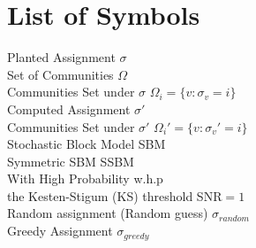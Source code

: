 \section*{List of Symbols}

\begin{large}
Planted Assignment \hfill $\sigma$\\
Set of Communities \hfill $\Omega$\\
Communities Set under $\sigma$ \hfill $\Omega_i=\{v: \sigma_v=i\}$\\
Computed Assignment \hfill $\sigma'$\\
Communities Set under $\sigma'$ \hfill $\Omega_i'=\{v: \sigma_v'=i\}$\\
Stochastic Block Model \hfill SBM\\
Symmetric SBM \hfill SSBM\\
With High Probability \hfill w.h.p\\
the Kesten-Stigum (KS) threshold \hfill SNR$=1$\\
Random assignment (Random guess) \hfill $\sigma_{random}$\\
Greedy Assignment \hfill $\sigma_{greedy}$\\
\end{large}